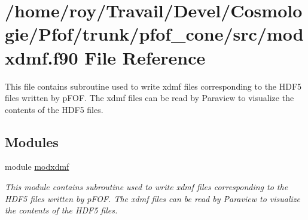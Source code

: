 \hypertarget{modxdmf_8f90}{}\section{/home/roy/\+Travail/\+Devel/\+Cosmologie/\+Pfof/trunk/pfof\+\_\+cone/src/modxdmf.f90 File Reference}
\label{modxdmf_8f90}


This file contains subroutine used to write xdmf files corresponding to the H\+D\+F5 files written by p\+F\+OF. The xdmf files can be read by Paraview to visualize the contents of the H\+D\+F5 files.  


\subsection*{Modules}
\begin{DoxyCompactItemize}
\item 
module \hyperlink{namespacemodxdmf}{modxdmf}
\begin{DoxyCompactList}\small\item\em This module contains subroutine used to write xdmf files corresponding to the H\+D\+F5 files written by p\+F\+OF. The xdmf files can be read by Paraview to visualize the contents of the H\+D\+F5 files. \end{DoxyCompactList}\end{DoxyCompactItemize}
